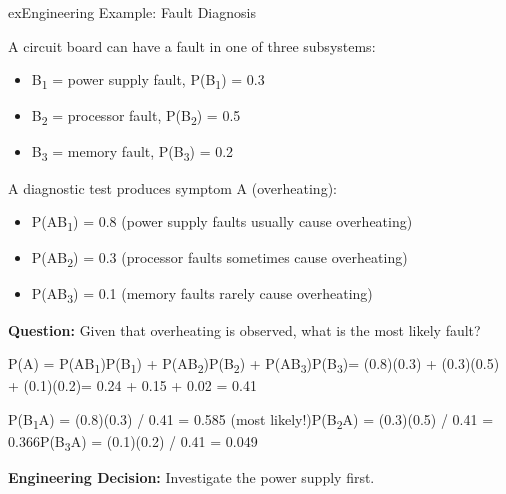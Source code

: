 \begin{PSbox}[unbreakable]{ex}{Engineering Example: Fault Diagnosis}

A circuit board can have a fault in one of three subsystems:

\begin{itemize}
\tightlist
\item
  B\textsubscript{1} = power supply fault, P(B\textsubscript{1}) = 0.3
\item
  B\textsubscript{2} = processor fault, P(B\textsubscript{2}) = 0.5
\item
  B\textsubscript{3} = memory fault, P(B\textsubscript{3}) = 0.2
\end{itemize}

A diagnostic test produces symptom A (overheating):

\begin{itemize}
\tightlist
\item
  P(A\textbar{}B\textsubscript{1}) = 0.8 (power supply faults usually cause overheating)
\item
  P(A\textbar{}B\textsubscript{2}) = 0.3 (processor faults sometimes cause overheating)
\item
  P(A\textbar{}B\textsubscript{3}) = 0.1 (memory faults rarely cause overheating)
\end{itemize}

\textbf{Question:} Given that overheating is observed, what is the most likely fault?

\PSsolution{} 

P(A) = P(A\textbar{}B\textsubscript{1})P(B\textsubscript{1}) + P(A\textbar{}B\textsubscript{2})P(B\textsubscript{2}) + P(A\textbar{}B\textsubscript{3})P(B\textsubscript{3})\PSbr{}= (0.8)(0.3) + (0.3)(0.5) + (0.1)(0.2)\PSbr{}= 0.24 + 0.15 + 0.02 = 0.41

P(B\textsubscript{1}\textbar{}A) = (0.8)(0.3) / 0.41 = 0.585 (most likely!)\PSbr{}P(B\textsubscript{2}\textbar{}A) = (0.3)(0.5) / 0.41 = 0.366\PSbr{}P(B\textsubscript{3}\textbar{}A) = (0.1)(0.2) / 0.41 = 0.049

\textbf{Engineering Decision:} Investigate the power supply first.

\end{PSbox}

